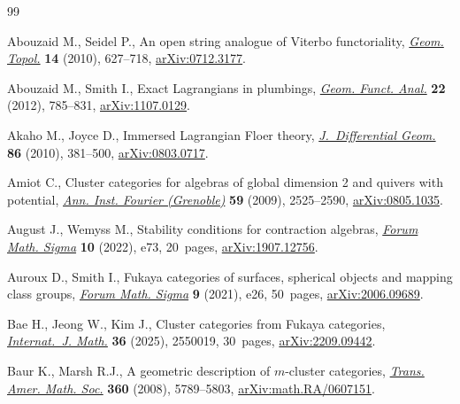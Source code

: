 \documentclass[10pt,a4paper]{amsart}
\theoremstyle{definition}
\numberwithin{equation}{section}
\begin{document}
\begin{thebibliography}{99}
\footnotesize\itemsep=0pt

Abouzaid M., Seidel P., An open string analogue of {V}iterbo functoriality,
 \href{https://doi.org/10.2140/gt.2010.14.627}{\textit{Geom. Topol.}}
 \textbf{14} (2010), 627--718,
 \href{http://arxiv.org/abs/0712.3177}{arXiv:0712.3177}.

Abouzaid M., Smith I., Exact {L}agrangians in plumbings,
 \href{https://doi.org/10.1007/s00039-012-0162-y}{\textit{Geom. Funct. Anal.}}
 \textbf{22} (2012), 785--831,
 \href{http://arxiv.org/abs/1107.0129}{arXiv:1107.0129}.

Akaho M., Joyce D., Immersed {L}agrangian {F}loer theory,
 \href{https://doi.org/10.4310/jdg/1303219427}{\textit{J.~Differential Geom.}}
 \textbf{86} (2010), 381--500,
 \href{http://arxiv.org/abs/0803.0717}{arXiv:0803.0717}.

Amiot C., Cluster categories for algebras of global dimension 2 and quivers
 with potential, \href{https://doi.org/10.5802/aif.2499}{\textit{Ann. Inst.
 Fourier (Grenoble)}} \textbf{59} (2009), 2525--2590,
 \href{http://arxiv.org/abs/0805.1035}{arXiv:0805.1035}.

August J., Wemyss M., Stability conditions for contraction algebras,
 \href{https://doi.org/10.1017/fms.2022.65}{\textit{Forum Math. Sigma}}
 \textbf{10} (2022), e73, 20~pages,
 \href{http://arxiv.org/abs/1907.12756}{arXiv:1907.12756}.

Auroux D., Smith I., Fukaya categories of surfaces, spherical objects and
 mapping class groups,
 \href{https://doi.org/10.1017/fms.2021.21}{\textit{Forum Math. Sigma}}
 \textbf{9} (2021), e26, 50~pages,
 \href{http://arxiv.org/abs/2006.09689}{arXiv:2006.09689}.

Bae H., Jeong W., Kim J., Cluster categories from {F}ukaya categories,
 \href{https://doi.org/10.1142/S0129167X25500193}{\textit{Internat.~J. Math.}}
 \textbf{36} (2025), 2550019, 30~pages,
 \href{http://arxiv.org/abs/2209.09442}{arXiv:2209.09442}.

Baur K., Marsh R.J., A geometric description of {$m$}-cluster categories,
 \href{https://doi.org/10.1090/S0002-9947-08-04441-3}{\textit{Trans. Amer.
 Math. Soc.}} \textbf{360} (2008), 5789--5803,
 \href{http://arxiv.org/abs/math.RA/0607151}{arXiv:math.RA/0607151}.


\end{thebibliography}
\end{document}
